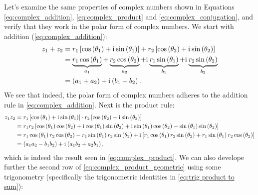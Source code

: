Let's examine the same properties of complex numbers shown in Equations \ref{eq:complex_addition}, \ref{eq:complex_product} and \ref{eq:complex_conjugation}, and verify that they work in the polar form of complex numbers. We start with addition (\autoref{eq:complex_addition}):
\begin{align}
	z_{1}+z_{2} &= r_{1}\left[ \cos\left( \theta_{1} \right) + \mathrm{i}\mkern1mu\sin\left( \theta_{1} \right) \right] + r_{2}\left[ \cos\left( \theta_{2} \right) + \mathrm{i}\mkern1mu\sin\left( \theta_{2} \right) \right]\nonumber\\
	&= \underbrace{r_{1}\cos\left( \theta_{1} \right)}_{a_{1}} + \underbrace{r_{2}\cos\left( \theta_{2} \right)}_{a_{2}} + \mathrm{i}\mkern1mu\underbrace{r_{1}\sin\left( \theta_{1} \right)}_{b_{1}} + \mathrm{i}\mkern1mu\underbrace{r_{2}\sin\left( \theta_{2} \right)}_{b_{2}}\nonumber\\
&= \left( a_{1}+a_{2} \right) + \mathrm{i}\mkern1mu\left( b_{1}+b_{2} \right).
	\label{eq:complex_addition_geometric}
\end{align}
We see that indeed, the polar form of complex numbers adheres to the addition rule in \autoref{eq:complex_addition}. Next is the product rule:
\begin{align}
	z_{1}z_{2} &= r_{1}\left[ \cos\left(\theta_{1}\right) + \mathrm{i}\mkern1mu\sin\left(\theta_{1}\right) \right] \cdot r_{2}\left[ \cos\left(\theta_{2}\right) + \mathrm{i}\mkern1mu\sin\left(\theta_{2}\right) \right]\nonumber\\
	&= r_{1}r_{2}\left[ \cos\left( \theta_{1} \right)\cos\left( \theta_{2} \right) + \mathrm{i}\mkern1mu\cos\left( \theta_{1} \right)\sin\left( \theta_{2} \right) + \mathrm{i}\mkern1mu\sin\left( \theta_{1} \right)\cos\left( \theta_{2} \right) -\sin\left( \theta_{1} \right)\sin\left( \theta_{2} \right)  \right]\nonumber\\
	&= r_{1}\cos\left( \theta_{1} \right)r_{2}\cos\left( \theta_{2} \right) - r_{1}\sin\left( \theta_{1} \right)r_{2}\sin\left( \theta_{2} \right) + \mathrm{i}\mkern1mu\left[ r_{1}\cos\left( \theta_{1} \right)r_{2}\sin\left( \theta_{2} \right) + r_{1}\sin\left( \theta_{1} \right)r_{2}\cos\left( \theta_{2} \right) \right]\nonumber\\
	&= \left( a_{1}a_{2}-b_{1}b_{2} \right) + \mathrm{i}\mkern1mu\left( a_{1}b_{2} + a_{2}b_{1} \right),
	\label{eq:complex_product_geometric}
\end{align}
which is indeed the result seen in \autoref{eq:complex_product}. We can also develope further the second row of \autoref{eq:complex_product_geometric} using some trigonometry (specifically the trigonometric identities in \autoref{eq:trig product to sum}):

